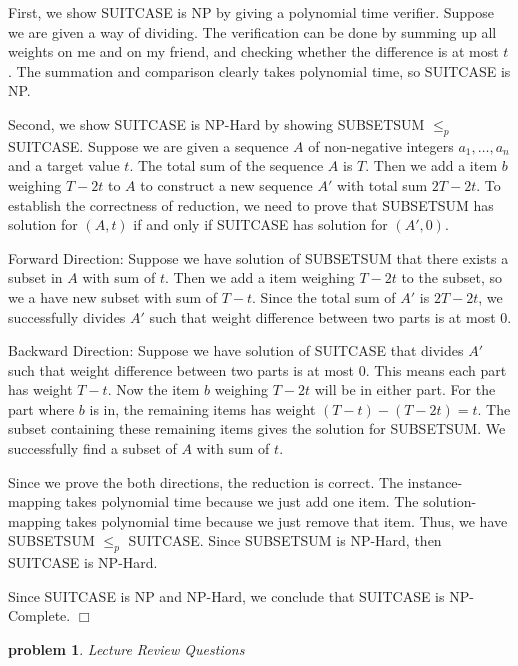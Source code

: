 \documentclass[10pt]{article}
\newenvironment{proof}{\par\noindent{\it Proof.}\hspace*{1em}}{$\Box$\bigskip}
\newtheorem{problem}{\sc\color{cit}problem}
\newcommand{\points}[1]{\normalfont{[#1 points]}}
\begin{document}
\begin{proof}
First, we show SUITCASE is NP by giving a polynomial time verifier. Suppose we are given a way of dividing. The verification can be done by summing up all weights on me and on my friend, and checking whether the difference is at most $t$. The summation and comparison clearly takes polynomial time, so SUITCASE is NP.

Second, we show SUITCASE is NP-Hard by showing SUBSETSUM $\leq _p$ SUITCASE. Suppose we are given a sequence $A$ of non-negative integers $a_1, \ldots, a_n$ and a target value $t$. The total sum of the sequence $A$ is $T$. Then we add a item $b$ weighing $T-2t$ to $A$ to construct a new sequence $A'$ with total sum $2T-2t$. To establish the correctness of reduction, we need to prove that SUBSETSUM has solution for $(A,t)$ if and only if SUITCASE has solution for $(A',0)$.

Forward Direction: Suppose we have solution of SUBSETSUM that there exists a subset in $A$ with sum of $t$. Then we add a item weighing $T-2t$ to the subset, so we a have new subset with sum of $T-t$. Since the total sum of $A'$ is $2T-2t$, we successfully divides $A'$ such that weight difference between two parts is at most 0. 

Backward Direction: Suppose we have solution of SUITCASE that divides $A'$ such that weight difference between two parts is at most 0. This means each part has weight $T-t$. Now the item $b$ weighing $T-2t$ will be in either part. For the part where $b$ is in, the remaining items has weight $(T-t)-(T-2t)=t$. The subset containing these remaining items gives the solution for SUBSETSUM. We successfully find a subset of $A$ with sum of $t$.

Since we prove the both directions, the reduction is correct. The instance-mapping takes polynomial time because we just add one item. The solution-mapping takes polynomial time because we just remove that item. Thus, we have SUBSETSUM $\leq _p$ SUITCASE. Since SUBSETSUM is NP-Hard, then SUITCASE is NP-Hard.

Since SUITCASE is NP and NP-Hard, we conclude that SUITCASE is NP-Complete.
\end{proof}
\newpage
\begin{problem} Lecture Review Questions \points{20}\end{problem}
\end{document}
